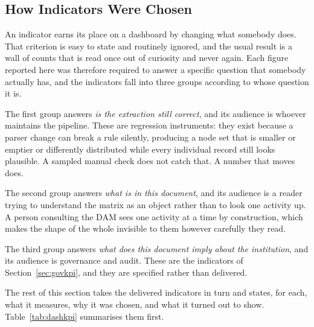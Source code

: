 \subsection{How Indicators Were Chosen}

An indicator earns its place on a dashboard by changing what somebody does. That criterion
is easy to state and routinely ignored, and the usual result is a wall of counts that is
read once out of curiosity and never again. Each figure reported here was therefore required
to answer a specific question that somebody actually has, and the indicators fall into three
groups according to whose question it is.

The first group answers \emph{is the extraction still correct}, and its audience is whoever
maintains the pipeline. These are regression instruments: they exist because a parser change
can break a rule silently, producing a node set that is smaller or emptier or differently
distributed while every individual record still looks plausible. A sampled manual check does
not catch that. A number that moves does.

The second group answers \emph{what is in this document}, and its audience is a reader
trying to understand the matrix as an object rather than to look one activity up. A person
consulting the DAM sees one activity at a time by construction, which makes the shape of the
whole invisible to them however carefully they read.

The third group answers \emph{what does this document imply about the institution}, and its
audience is governance and audit. These are the indicators of Section~\ref{sec:govkpi}, and
they are specified rather than delivered.

The rest of this section takes the delivered indicators in turn and states, for each, what it
measures, why it was chosen, and what it turned out to show. Table~\ref{tab:dashkpi}
summarises them first.

